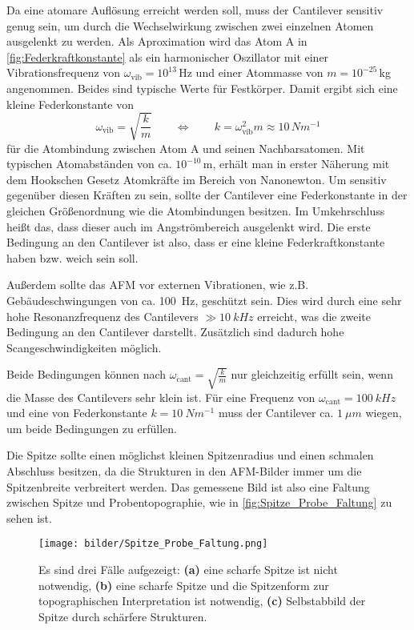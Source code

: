     Da eine atomare Auflösung erreicht werden soll, muss der Cantilever sensitiv genug sein, um durch die Wechselwirkung zwischen zwei einzelnen Atomen ausgelenkt zu werden.
    Als Aproximation wird das Atom A in \autoref{fig:Federkraftkonstante} als ein harmonischer Oszillator mit einer Vibrationsfrequenz von $\omega_{\mathrm{vib}} = 10^{13}\,$Hz und einer Atommasse von $m = 10^{-25}\,$kg angenommen.
    Beides sind typische Werte für Festkörper.
    Damit ergibt sich eine kleine Federkonstante von
    \begin{equation}
        \omega_{\mathrm{vib}} = \sqrt{\frac{k}{m}} \qquad \Leftrightarrow \qquad k = \omega_{\mathrm{vib}}^2 m \approx 10\,\si{Nm^{-1}}
    \end{equation}
    für die Atombindung zwischen Atom A und seinen Nachbarsatomen.
    Mit typischen Atomabständen von ca. $10^{-10}\,$m, erhält man in erster Näherung mit dem Hookschen Gesetz Atomkräfte im Bereich von Nanonewton.
    Um sensitiv gegenüber diesen Kräften zu sein, sollte der Cantilever eine Federkonstante in der gleichen Größenordnung wie die Atombindungen besitzen.
    Im Umkehrschluss heißt das, dass dieser auch im Angströmbereich ausgelenkt wird.
    Die erste Bedingung an den Cantilever ist also, dass er eine kleine Federkraftkonstante haben bzw. weich sein soll.

    Außerdem sollte das AFM vor externen Vibrationen, wie z.B. Gebäudeschwingungen von ca. \SI{100}{Hz}, geschützt sein.
    Dies wird durch eine sehr hohe Resonanzfrequenz des Cantilevers $\gg \SI{10}{kHz}$ erreicht, was die zweite Bedingung an den Cantilever darstellt.
    Zusätzlich sind dadurch hohe Scangeschwindigkeiten möglich.
    
    Beide Bedingungen können nach $\omega_{\mathrm{cant}} = \sqrt{\frac{k}{m}}$ nur gleichzeitig erfüllt sein, wenn die Masse des Cantilevers sehr klein ist.
    Für eine Frequenz von $\omega_{\mathrm{cant}} = \SI{100}{kHz}$ und eine von Federkonstante $k = \SI{10}{Nm^{-1}}$ muss der Cantilever ca. $\SI{1}{\mu m}$ wiegen, um beide Bedingungen zu erfüllen.

    Die Spitze sollte einen möglichst kleinen Spitzenradius und einen schmalen Abschluss besitzen, da die Strukturen in den AFM-Bilder immer um die Spitzenbreite verbreitert werden.
    Das gemessene Bild ist also eine Faltung zwischen Spitze und Probentopographie, wie in \autoref{fig:Spitze_Probe_Faltung} zu sehen ist.
    \begin{figure}[ht]
        \centering\captionsetup{format=plain}
        \texttt{[image: bilder/Spitze\_Probe\_Faltung.png]}
        \caption{Es sind drei Fälle aufgezeigt: \textbf{(a)} eine scharfe Spitze ist nicht notwendig, \textbf{(b)} eine scharfe Spitze und die Spitzenform zur topographischen Interpretation ist notwendig, \textbf{(c)} Selbstabbild der Spitze durch schärfere Strukturen. \cite{AFM_image_artifacts}}
        \label{fig:Spitze_Probe_Faltung}
    \end{figure}

